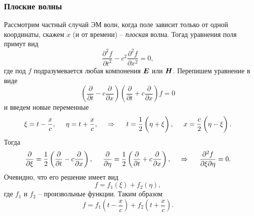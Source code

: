 \subsubsection*{Плоские волны}

Рассмотрим частный случай ЭМ волн, когда поле зависит только от одной координаты, скажем $x$ (и от времени) -- \textit{плоская} волна. Тогад уравнения поля примут вид
\begin{equation*}
    \frac{\partial^2 f}{\partial t^2}  - c^2 \frac{\partial^2 f}{\partial x^2}  = 0,
\end{equation*}
где под $f$ подразумевается любая компонения $\mbox{\boldmath $E$}$ или $\mbox{\boldmath $H$}$. Перепишем уравнение в виде
\begin{equation*}
    \left(
        \frac{\partial }{\partial t} - c \frac{\partial }{\partial x} 
    \right)
    \left(
        \frac{\partial }{\partial t} + c \frac{\partial }{\partial x} 
    \right) f = 0
\end{equation*}
и введем новые переменные 
\begin{equation*}
    \xi = t - \frac{x}{c}, \hspace{0.5cm} \eta = t + \frac{x}{c},
    \hspace{0.5cm} \Rightarrow \hspace{0.5cm} 
    t  = \frac{1}{2} \left(\vph \eta + \xi \right),
    \hspace{0.5cm} 
    x = \frac{c}{2} \left(
        \vph \eta - \xi
    \right).
\end{equation*}
Тогда
\begin{equation*}
    \frac{\partial }{\partial \xi} = \frac{1}{2} \left(
        \frac{\partial }{\partial t} - c \frac{\partial }{\partial x} 
    \right),
    \hspace{0.5cm} 
    \frac{\partial }{\partial \eta} = \frac{1}{2} \left(
        \frac{\partial }{\partial t}  + c \frac{\partial }{\partial x} 
    \right),
    \hspace{0.5cm} \Rightarrow \hspace{0.5cm} 
    \frac{\partial^2 f}{\partial \xi \partial \eta} = 0.
\end{equation*}
Очевидно, что его решение имеет вид
\begin{equation*}
    f = f_1(\xi) + f_2(\eta),
\end{equation*}
где $f_1$ и $f_2$ -- произвольные функции. Таким образом
\begin{equation}
    f = f_1 \left(t - \frac{x}{c} \right) + f_2 \left(t + \frac{x}{c} \right).
\end{equation}

